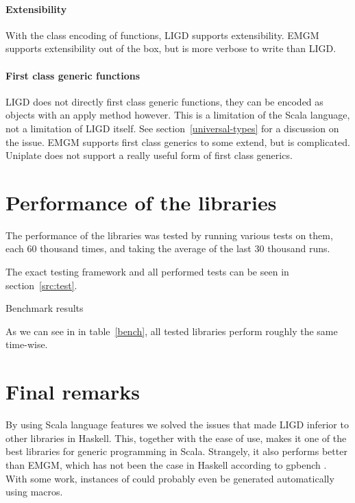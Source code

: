\paragraph{Extensibility}
With the class encoding of functions, LIGD supports
extensibility. EMGM supports extensibility out of the box, but is more verbose
to write than LIGD. 

\paragraph{First class generic functions}
LIGD does not directly first class generic functions, they can be encoded as
objects with an apply method however. This is a limitation of the Scala
language, not a limitation of LIGD itself. See section~\ref{universal-types}
for a discussion on the issue. EMGM supports first class generics to some
extend, but is complicated. Uniplate does not support a really useful form
of first class generics. 

\section{Performance of the libraries}
The performance of the libraries was tested by running various tests on them,
each 60 thousand times, and taking the average of the last 30 thousand runs.

The exact testing framework and all performed tests can be seen in
section~\ref{src:test}.

\begin{table}[ht]

\caption{Benchmark results}
\label{bench}
\end{table}

As we can see in in table~\ref{bench}, all tested libraries perform roughly
the same time-wise.

\section{Final remarks}
By using Scala language features we solved the issues that made LIGD inferior to
other libraries in Haskell. This, together with the ease of use, makes it one
of the best libraries for generic programming in Scala. Strangely, it also
performs better than EMGM, which has not been the case in Haskell according
to gpbench \cite{DBLP:conf/haskell/RodriguezJJGKO08}. With some work, instances
of  could probably even be generated automatically using macros. 

